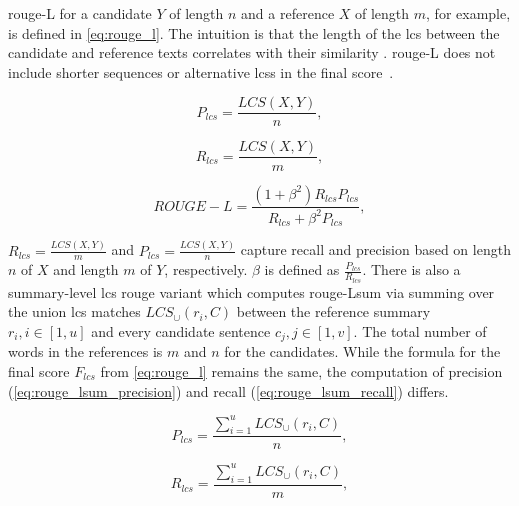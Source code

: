 \ac{rouge}-L for a candidate $Y$ of length $n$ and a reference $X$ of length $m$, for example, is defined in \autoref{eq:rouge_l}.
The intuition is that the length of the \ac{lcs} between the candidate and reference texts correlates with their similarity \citep{lin_rouge_2004}.
\ac{rouge}-L does not include shorter sequences or alternative \acp{lcs} in the final score~\citep{lin_rouge_2004}.

\begin{equation}
P_{lcs} = \frac{LCS(X,Y)}{n},
\label{eq:rouge_l_precision}
\end{equation}

\begin{equation}
R_{lcs} = \frac{LCS(X,Y)}{m},
\label{eq:rouge_l_recall}
\end{equation}

\begin{equation}
ROUGE-L = \frac{(1 + \beta^2)R_{lcs}P_{lcs}}{R_{lcs} + \beta^2 P_{lcs}},
\label{eq:rouge_l}
\end{equation}

$R_{lcs} = \frac{LCS(X,Y)}{m}$ and $P_{lcs} = \frac{LCS(X,Y)}{n}$ capture recall and precision based on length $n$ of $X$ and length $m$ of $Y$, respectively.
$\beta$ is defined as $\frac{P_{lcs}}{R_{lcs}}$.
There is also a summary-level \ac{lcs} \ac{rouge} variant which computes \ac{rouge}-Lsum via summing over the union \ac{lcs} matches $LCS_\cup(r_i,C)$ between the reference summary $r_i, i \in [1,u]$ and every candidate sentence $c_j, j \in [1,v]$.
The total number of words in the references is $m$ and $n$ for the candidates.
While the formula for the final score $F_{lcs}$ from \autoref{eq:rouge_l} remains the same, the computation of precision (\autoref{eq:rouge_lsum_precision}) and recall (\autoref{eq:rouge_lsum_recall}) differs.

\begin{equation}
P_{lcs} = \frac{\sum_{i=1}^{u}LCS_\cup(r_i,C)}{n},
\label{eq:rouge_lsum_precision}
\end{equation}

\begin{equation}
R_{lcs} = \frac{\sum_{i=1}^{u}LCS_\cup(r_i,C)}{m},
\label{eq:rouge_lsum_recall}
\end{equation}

